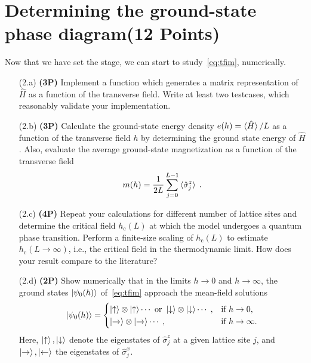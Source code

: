 \documentclass[a4paper, 12pt]{article}
\begin{document}
%
\section{Determining the ground-state phase diagram\textbf{(12 Points)}}
%
Now that we have set the stage, we can start to study~\cref{eq:tfim}, numerically.
%
\begin{itemize}
	\item[(2.a)] \textbf{(3P)}
	Implement a function which generates a matrix representation of $\hat H$ as a function of the transverse field.
	Write at least two testcases, which reasonably validate your implementation.
	\item[(2.b)] \textbf{(3P)}
	Calculate the ground-state energy density $e(h) = \braket{\hat H}/L$ as a function of the transverse field $h$ by determining the ground state energy of $\hat H$.
	Also, evaluate the average ground-state magnetization as a function of the transverse field
	\begin{equation}
		m(h) = \frac{1}{2L} \sum_{j=0}^{L-1} \braket{\hat \sigma^z_j} \;.
	\end{equation}
	\item[(2.c)] \textbf{(4P)}
	Repeat your calculations for different number of lattice sites and determine the critical field $h_\mathrm{c}(L)$ at which the model undergoes a quantum phase transition.
	Perform a finite-size scaling of $h_\mathrm{c}(L)$ to estimate $h_\mathrm{c}(L\rightarrow \infty)$, i.e., the critical field in the thermodynamic limit.
	How does your result compare to the literature?
	\item[(2.d)] \textbf{(2P)}
	Show numerically that in the limits $h\rightarrow 0$ and $h\rightarrow \infty$, the ground states $\ket{\psi_0(h)}$ of~\cref{eq:tfim} approach the mean-field solutions
	\begin{equation}
		\ket{\psi_0(h)}
		=
		\begin{cases}
			\ket{\uparrow}\otimes\ket{\uparrow} \cdots \text{ or } \ket{\downarrow}\otimes\ket{\downarrow} \cdots\;, &\text{if $h\rightarrow 0$,} \\
			\ket{\rightarrow}\otimes\ket{\rightarrow} \cdots\;, &\text{if $h\rightarrow \infty$.} \\
		\end{cases}
	\end{equation}
	Here, $\ket{\uparrow},\ket{\downarrow}$ denote the eigenstates of $\hat \sigma^z_j$ at a given lattice site $j$, and $\ket{\rightarrow},\ket{\leftarrow}$ the eigenstates of $\hat \sigma^x_j$.
\end{itemize}
%
\batchmode  %
\end{document}
